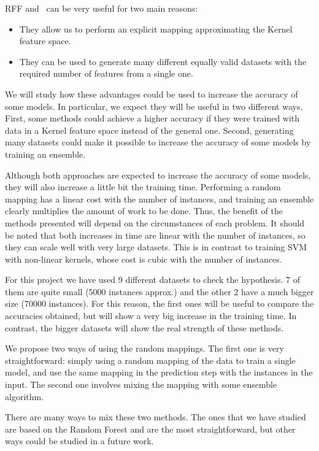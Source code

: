 \begin{pre-delivery}
  RFF and \Nys\ can be very useful for two main reasons:
  \begin{itemize}
    \item They allow us to perform an explicit mapping approximating the Kernel
    feature space.
    \item They can be used to generate many different equally valid datasets
    with the required number of features from a single one.
  \end{itemize}

  We will study how these advantages could be used to increase the accuracy
  of some models. In particular, we expect they will be useful in two
  different ways. First, some methods could achieve a higher accuracy if they
  were trained with data in a Kernel feature space instead of the general
  one. Second, generating many datasets could make it possible to increase the
  accuracy of some models by training an ensemble.

  Although both approaches are expected to increase the accuracy of some
  models, they will also increase a little bit the training time. Performing
  a random mapping has a linear cost with the number of instances, and training
  an ensemble clearly multiplies the amount of work to be done. Thus, the
  benefit of the methods presented will depend on the circumstances of
  each problem. It should be noted that both increases in time are linear with the
  number of instances, so they can scale well with very large datasets. This is
  in contrast to training SVM with non-linear kernels, whose cost is cubic
  with the number of instances.

  For this project we have used 9 different datasets to check the hypothesis. 7
  of them are quite small (5000 instances approx.) and the other 2 have a much
  bigger size (70000 instances). For this reason, the first ones will be useful
  to compare the accuracies obtained, but will show a very big increase in the
  training time. In contrast, the bigger datasets will show the real strength
  of these methods.

  We propose two ways of using the random mappings. The first one is very
  straightforward: simply using a random mapping of the data to train a
  single model, and use the same mapping in the prediction step with
  the instances in the input. The second one involves mixing the mapping
  with some ensemble algorithm.

  There are many ways to mix these two methods. The ones that we have studied
  are based on the Random Forest and are the most straightforward, but other
  ways could be studied in a future work.


\end{pre-delivery}
